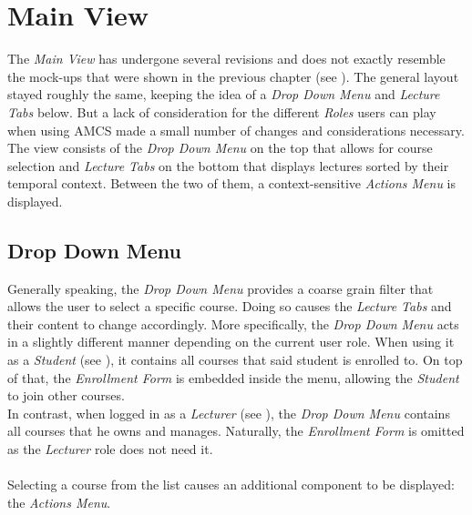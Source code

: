 \section{Main View}

The \emph{Main View} has undergone several revisions and does not exactly resemble the mock-ups that were shown in the previous chapter (see ). The general layout stayed roughly the same, keeping the idea of a \emph{Drop Down Menu} and \emph{Lecture Tabs} below. But a lack of consideration for the different \emph{Roles} users can play when using AMCS made a small number of changes and considerations necessary.
\\

The view consists of the \emph{Drop Down Menu} on the top that allows for course selection and \emph{Lecture Tabs} on the bottom that displays lectures sorted by their temporal context. Between the two of them, a context-sensitive \emph{Actions Menu} is displayed.


\subsection{Drop Down Menu}
Generally speaking, the \emph{Drop Down Menu} provides a coarse grain filter that allows the user to select a specific course. Doing so causes the \emph{Lecture Tabs} and their content to change accordingly.
More specifically, the \emph{Drop Down Menu} acts in a slightly different manner depending on the current user role. When using it as a \emph{Student} (see ), it contains all courses that said student is enrolled to. On top of that, the \emph{Enrollment Form} is embedded inside the menu, allowing the \emph{Student} to join other courses.
\\
In contrast, when logged in as a \emph{Lecturer} (see ), the \emph{Drop Down Menu} contains all courses that he owns and manages. Naturally, the \emph{Enrollment Form} is omitted as the \emph{Lecturer} role does not need it.
\\
\\
Selecting a course from the list causes an additional component to be displayed: the \emph{Actions Menu}.
